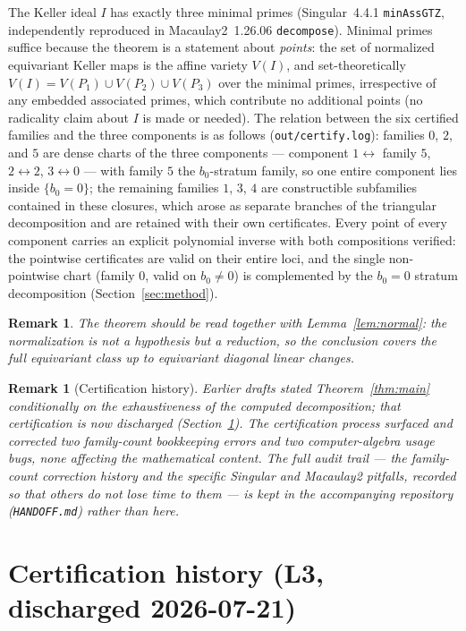 \documentclass[11pt]{article}
\newtheorem{remark}[theorem]{Remark}
\begin{document}
The Keller ideal $I$ has exactly three minimal primes (Singular~4.4.1
\texttt{minAssGTZ}, independently reproduced in Macaulay2~1.26.06
\texttt{decompose}). Minimal primes suffice because the theorem is a
statement about \emph{points}: the set of normalized equivariant Keller maps
is the affine variety $V(I)$, and set-theoretically
$V(I)=V(P_1)\cup V(P_2)\cup V(P_3)$ over the minimal primes, irrespective of
any embedded associated primes, which contribute no additional points (no
radicality claim about $I$ is made or needed). The relation between the six
certified families and the three components is as follows
(\texttt{out/certify.log}): families $0$, $2$, and $5$ are dense charts of
the three components --- component $1\leftrightarrow$ family $5$,
$2\leftrightarrow2$, $3\leftrightarrow0$ --- with family $5$ the
$b_0$-stratum family, so one entire component lies inside $\{b_0=0\}$; the
remaining families $1$, $3$, $4$ are constructible subfamilies contained in
these closures, which arose as separate branches of the triangular
decomposition and are retained with their own certificates. Every point of
every component carries an explicit polynomial inverse with both
compositions verified: the pointwise certificates are valid on their entire
loci, and the single non-pointwise chart (family $0$, valid on $b_0\neq0$)
is complemented by the $b_0=0$ stratum decomposition
(Section~\ref{sec:method}).

\begin{remark}
The theorem should be read together with Lemma~\ref{lem:normal}: the
normalization is not a hypothesis but a reduction, so the conclusion covers
the full equivariant class up to equivariant diagonal linear changes.
\end{remark}

\begin{remark}[Certification history]
Earlier drafts stated Theorem~\ref{thm:main} conditionally on the
exhaustiveness of the computed decomposition; that certification is now
discharged (Section~\ref{sec:pending}). The certification process surfaced
and corrected two family-count bookkeeping errors and two computer-algebra
usage bugs, none affecting the mathematical content. The full audit trail
--- the family-count correction history and the specific Singular and
Macaulay2 pitfalls, recorded so that others do not lose time to them --- is
kept in the accompanying repository (\texttt{HANDOFF.md}) rather than here.
\end{remark}

\section{Certification history (L3, discharged 2026-07-21)}\label{sec:pending}
\end{document}
